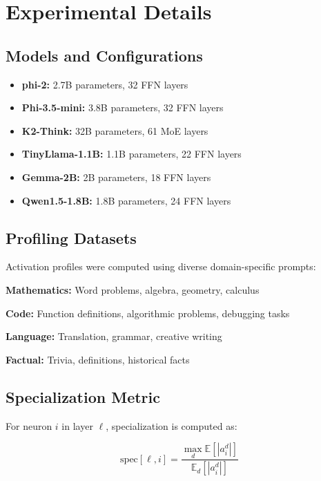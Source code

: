 \documentclass{article}
\begin{document}
\appendix

\section{Experimental Details}

\subsection{Models and Configurations}

\begin{itemize}
    \item \textbf{phi-2:} 2.7B parameters, 32 FFN layers
    \item \textbf{Phi-3.5-mini:} 3.8B parameters, 32 FFN layers
    \item \textbf{K2-Think:} 32B parameters, 61 MoE layers
    \item \textbf{TinyLlama-1.1B:} 1.1B parameters, 22 FFN layers
    \item \textbf{Gemma-2B:} 2B parameters, 18 FFN layers
    \item \textbf{Qwen1.5-1.8B:} 1.8B parameters, 24 FFN layers
\end{itemize}

\subsection{Profiling Datasets}

Activation profiles were computed using diverse domain-specific prompts:

\textbf{Mathematics:} Word problems, algebra, geometry, calculus

\textbf{Code:} Function definitions, algorithmic problems, debugging tasks

\textbf{Language:} Translation, grammar, creative writing

\textbf{Factual:} Trivia, definitions, historical facts

\subsection{Specialization Metric}

For neuron $i$ in layer $\ell$, specialization is computed as:

\begin{equation}
\text{spec}[\ell, i] = \frac{\max_d \mathbb{E}[|a_i^d|]}{\mathbb{E}_d[|a_i^d|]}
\end{equation}
\end{document}
